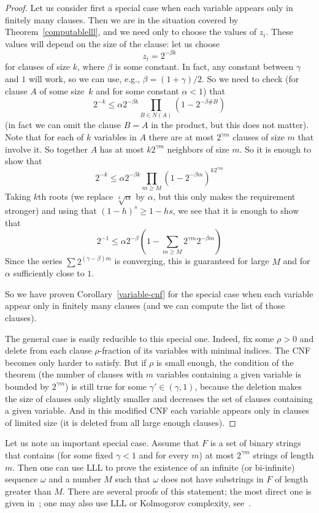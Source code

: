 \documentclass[12pt]{article}
\begin{document}
\begin{proof} Let us consider first a special case when each variable appears
only in finitely many clauses. Then we are in the situation covered by
Theorem~\ref{computablelll}, and we need only to choose the values of $z_i$.
These values will depend on the size of the clause: let us choose
  $$
z_i=2^{-\beta k}
  $$
for clauses of size $k$, where $\beta$ is some constant. In fact, any constant
between $\gamma$ and $1$ will work, so we can use, e.g., $\beta=(1+\gamma)/2$.
So we need to check (for clause $A$ of some size~$k$ and for some constant $\alpha<1$) that
  $$
2^{-k} \le \alpha 2^{-\beta k} \prod_{B\in N(A)} (1-2^{-\beta\#B})
  $$
(in fact we can omit the clause $B=A$ in the product, but this does not matter).
Note that for each of $k$ variables in $A$ there are at most $2^{\gamma m}$
clauses of size $m$ that involve it. So together $A$ has at most $k2^{\gamma m}$
neighbors of size $m$. So it is enough to show that
  $$
2^{-k} \le \alpha2^{-\beta k} \prod_{m\ge M} (1-2^{-\beta m})^{k2^{\gamma m}}
  $$
Taking $k$th roots (we replace $\sqrt[k]{\alpha}$ by $\alpha$, but this only makes the requirement stronger) and using that $(1-h)^s \ge 1-hs$, we see that it is enough
to show that
  $$
2^{-1} \le \alpha 2^{-\beta} \left(1-\sum_{m\ge M}2^{\gamma m} 2^{-\beta m}\right)
  $$
Since the series $\sum 2^{(\gamma-\beta)m}$ is converging, this is
guaranteed for large $M$ and for $\alpha$ sufficiently close to $1$.

So we have proven Corollary~\ref{variable-cnf} for the special case when
each variable appear only in finitely many clauses (and we can compute
the list of those clauses).

The general case is easily reducible to this special one. Indeed, fix some $\rho>0$ and delete from each clause $\rho$-fraction of its variables with minimal indices. The CNF becomes only harder to satisfy. But if $\rho$ is small enough, the condition of the theorem (the number of clauses with $m$ variables containing a given variable is bounded by $2^{\gamma m}$) is still true for some $\gamma'\in (\gamma,1)$, because the deletion makes the size of clauses only slightly smaller and decreases the set of clauses containing a given variable. And in this modified CNF each variable appears only in clauses of limited size (it is deleted from all large enough clauses).
\end{proof}

Let us note an important special case. Assume that $F$ is a set of binary strings that contains (for some fixed $\gamma<1$ and for every $m$) at most $2^{\gamma m}$ strings of length $m$. Then one can use LLL to prove the existence of an infinite (or bi-infinite) sequence $\omega$ and a number $M$ such that $\omega$ does not have substrings in $F$ of length greater than $M$. There are several proofs of this statement;  the most direct one is given in~\cite{miller-two-notes}; one may also use LLL or Kolmogorov complexity, see~\cite{rumyantsev-1,rumyantsev-2}.
\end{document}
